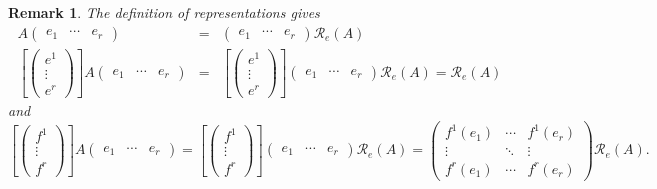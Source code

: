 \documentclass[aps,preprint]{revtex4}
\newtheorem{remark}[theorem]{Remark}
\begin{document}
\begin{remark}
The definition of representations gives 
\begin{eqnarray}
A\left( 
\begin{array}{ccc}
e_{1} & \cdots & e_{r}%
\end{array}%
\right) &=&\left( 
\begin{array}{ccc}
e_{1} & \cdots & e_{r}%
\end{array}%
\right) \mathcal{R}_{e}\left( A\right) \\
\left[ \left( 
\begin{array}{c}
e^{1} \\ 
\vdots \\ 
e^{r}%
\end{array}%
\right) \right] A\left( 
\begin{array}{ccc}
e_{1} & \cdots & e_{r}%
\end{array}%
\right) &=&\left[ \left( 
\begin{array}{c}
e^{1} \\ 
\vdots \\ 
e^{r}%
\end{array}%
\right) \right] \left( 
\begin{array}{ccc}
e_{1} & \cdots & e_{r}%
\end{array}%
\right) \mathcal{R}_{e}\left( A\right) =\mathcal{R}_{e}\left( A\right)
\end{eqnarray}%
and 
\begin{equation}
\left[ \left( 
\begin{array}{c}
f^{1} \\ 
\vdots \\ 
f^{r}%
\end{array}%
\right) \right] A\left( 
\begin{array}{ccc}
e_{1} & \cdots & e_{r}%
\end{array}%
\right) =\left[ \left( 
\begin{array}{c}
f^{1} \\ 
\vdots \\ 
f^{r}%
\end{array}%
\right) \right] \left( 
\begin{array}{ccc}
e_{1} & \cdots & e_{r}%
\end{array}%
\right) \mathcal{R}_{e}\left( A\right) =\left( 
\begin{array}{ccc}
f^{1}\left( e_{1}\right) & \cdots & f^{1}\left( e_{r}\right) \\ 
\vdots & \ddots & \vdots \\ 
f^{r}\left( e_{1}\right) & \cdots & f^{r}\left( e_{r}\right)%
\end{array}%
\right) \mathcal{R}_{e}\left( A\right) .
\end{equation}
\end{remark}
\end{document}
